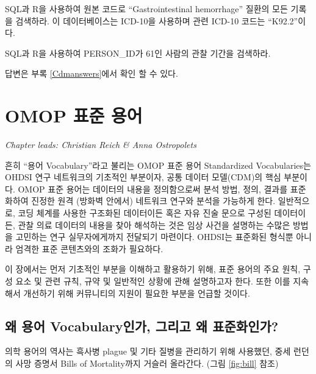 \documentclass[10.5pt]{book}
\theoremstyle{definition}
\theoremstyle{definition}
\theoremstyle{definition}
\theoremstyle{remark}
\let\BeginKnitrBlock\begin \let\EndKnitrBlock\end
\begin{document}
\BeginKnitrBlock{exercise}
\protect\hypertarget{exr:exercisePersonSource}{}{\label{exr:exercisePersonSource}
}SQL과 R을 사용하여 원본 코드로 ``Gastrointestinal hemorrhage'' 질환의
모든 기록을 검색하라. 이 데이터베이스는 ICD-10을 사용하며 관련 ICD-10
코드는 ``K92.2''이다.
\EndKnitrBlock{exercise}

\BeginKnitrBlock{exercise}
\protect\hypertarget{exr:exercisePerson61Records}{}{\label{exr:exercisePerson61Records}
}SQL과 R을 사용하여 PERSON\_ID가 61인 사람의 관찰 기간을 검색하라.
\EndKnitrBlock{exercise}

답변은 부록 \ref{Cdmanswers}에서 확인 할 수 있다.

\chapter{OMOP 표준 용어}\label{StandardizedVocabularies}


\emph{Chapter leads: Christian Reich \& Anna Ostropolets}

흔히 ``용어 Vocabulary''라고 불리는 OMOP 표준 용어 Standardized
Vocabularies는 OHDSI 연구 네트워크의 기초적인 부분이자, 공통 데이터
모델(CDM)의 핵심 부분이다. OMOP 표준 용어는 데이터의 내용을 정의함으로써
분석 방법, 정의, 결과를 표준화하여 진정한 원격 (방화벽 안에서) 네트워크
연구와 분석을 가능하게 한다. 일반적으로, 코딩 체계를 사용한 구조화된
데이터이든 혹은 자유 진술 문으로 구성된 데이터이든, 관찰 의료 데이터의
내용을 찾아 해석하는 것은 임상 사건을 설명하는 수많은 방법을 고민하는
연구 실무자에게까지 전달되기 마련이다. OHDSI는 표준화된 형식뿐 아니라
엄격한 표준 콘텐츠와의 조화가 필요하다.

이 장에서는 먼저 기초적인 부분을 이해하고 활용하기 위해, 표준 용어의
주요 원칙, 구성 요소 및 관련 규칙, 규약 및 일반적인 상황에 관해
설명하고자 한다. 또한 이를 지속해서 개선하기 위해 커뮤니티의 지원이
필요한 부분을 언급할 것이다.

\section{왜 용어 Vocabulary인가, 그리고 왜
표준화인가?}\label{--vocabulary---}

의학 용어의 역사는 흑사병 plague 및 기타 질병을 관리하기 위해 사용했던,
중세 런던의 사망 증명서 Bills of Mortality까지 거슬러 올라간다. (그림
\ref{fig:bill} 참조) 
\end{document}
